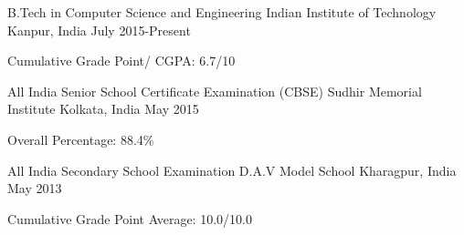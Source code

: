 

\begin{cventries}

  \cventry
  {B.Tech in Computer Science and Engineering} %
  {Indian Institute of Technology} %
  {Kanpur, India} %
  {July 2015-Present} %
  {
    \begin{cvitems} %
    \item {Cumulative Grade Point/ CGPA: 6.7/10 }
    \end{cvitems}
  }
  
  \cventry
  {All India Senior School Certificate Examination (CBSE)} %
  {Sudhir Memorial Institute} %
  {Kolkata, India} %
  {May 2015} %
  {
    \begin{cvitems} %
    \item {Overall Percentage: 88.4\%}
    \end{cvitems}
  }
  \cventry
  {All India Secondary School Examination} %
  {D.A.V Model School} %
  {Kharagpur, India} %
  {May 2013} %
  {
    \begin{cvitems} %
    \item {Cumulative Grade Point Average: 10.0/10.0}
    \end{cvitems}
  }
\end{cventries}
